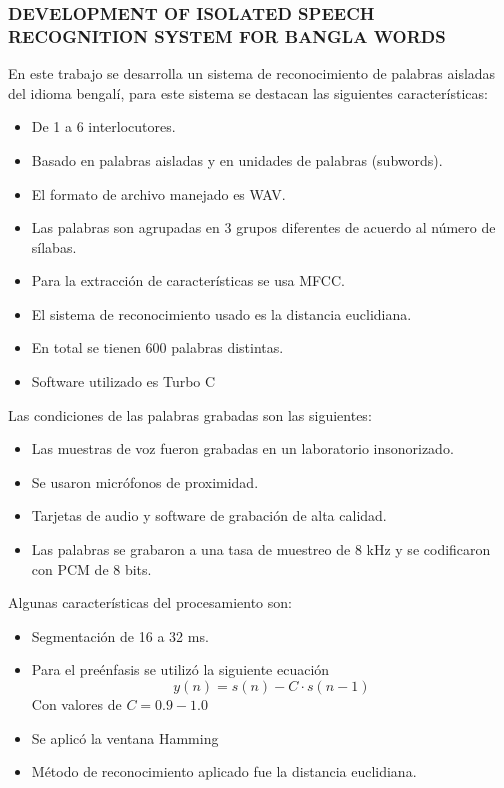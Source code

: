 	
	

	\subsubsection*{DEVELOPMENT OF ISOLATED SPEECH RECOGNITION SYSTEM FOR BANGLA WORDS \cite{A30}}\label{sub:sota:A30}
	
		En este trabajo se desarrolla un sistema de reconocimiento de palabras aisladas del idioma bengalí, para este sistema se destacan las siguientes características:
	
	\begin{itemize}
	\item	De 1 a 6 interlocutores.
	\item	Basado en palabras aisladas y en unidades de palabras (subwords).
	\item	El formato de archivo manejado es WAV.
	\item	Las palabras son agrupadas en 3 grupos diferentes de acuerdo al número de sílabas.
	\item	Para la extracción de características se usa MFCC.
	\item	El sistema de reconocimiento usado es la distancia euclidiana.
	\item	En total se tienen 600 palabras distintas.
	\item	Software utilizado es Turbo C
	\end{itemize}
	
	Las condiciones de las palabras grabadas son las siguientes:
	
	\begin{itemize}
	\item	Las muestras de voz fueron grabadas en un laboratorio insonorizado.
	\item	Se usaron micrófonos de proximidad.
	\item	Tarjetas de audio y software de grabación de alta calidad.
	\item	Las palabras se grabaron a una tasa de muestreo de 8 kHz y se codificaron con PCM de 8 bits.
	\end{itemize}
	
	Algunas características del procesamiento son:
	
	\begin{itemize}
	\item	Segmentación de 16 a 32 ms.
	\item	Para el preénfasis se utilizó la siguiente ecuación
		\begin{equation}\label{eq:xxx}
			y(n)=s(n)-C\cdot s(n-1)
		\end{equation}
		Con valores de $C=0.9 - 1.0$
	\item	Se aplicó la ventana Hamming
	\item	Método de reconocimiento aplicado fue la distancia euclidiana.
	\end{itemize}
	
